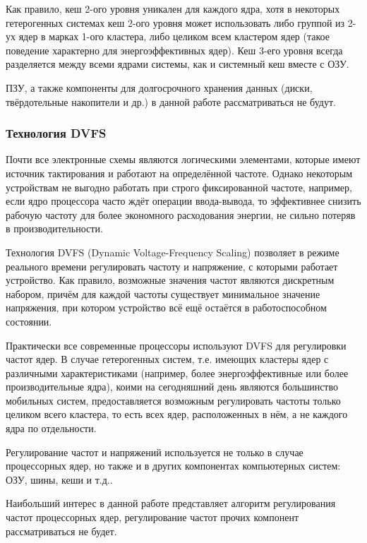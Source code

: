     Как правило, кеш 2-ого уровня уникален для каждого ядра, хотя в некоторых гетерогенных системах
    кеш 2-ого уровня может использовать либо группой из 2-ух ядер в марках 1-ого кластера, либо
    целиком всем кластером ядер (такое поведение характерно для энергоэффективных ядер).
    Кеш 3-его уровня всегда разделяется между всеми ядрами системы, как и системный кеш вместе с ОЗУ.

    ПЗУ, а также компоненты для долгосрочного хранения данных (диски, твёрдотельные накопители и др.)
    в данной работе рассматриваться не будут.

\subsubsection{Технология DVFS} \label{dvfs_chapter}

    Почти все электронные схемы являются логическими элементами, которые имеют источник тактирования
    и работают на определённой частоте. Однако некоторым устройствам не выгодно работать при
    строго фиксированной частоте, например, если ядро процессора часто ждёт операции ввода-вывода,
    то эффективнее снизить рабочую частоту для более экономного расходования энергии, не сильно
    потеряв в производительности.

    Технология DVFS (Dynamic Voltage-Frequency Scaling) позволяет в режиме реального времени
    регулировать частоту и напряжение, с которыми работает устройство. Как правило, возможные значения
    частот являются дискретным набором, причём для каждой частоты существует минимальное значение
    напряжения, при котором устройство всё ещё остаётся в работоспособном состоянии.

    Практически все современные процессоры используют DVFS для регулировки частот ядер. В случае
    гетерогенных систем, т.е. имеющих кластеры ядер с различными характеристиками (например, более
    энергоэффективные или более производительные ядра),
    коими на сегодняшний день являются большинство мобильных систем,
    предоставляется возможным регулировать частоты только целиком всего кластера, то есть всех ядер,
    расположенных в нём, а не каждого ядра по отдельности.

    Регулирование частот и напряжений используется не только в случае процессорных ядер, но также
    и в других компонентах компьютерных систем: ОЗУ, шины, кеши и т.д..

    Наибольший интерес в данной работе представляет алгоритм регулирования частот процессорных ядер,
    регулирование частот прочих компонент рассматриваться не будет.

